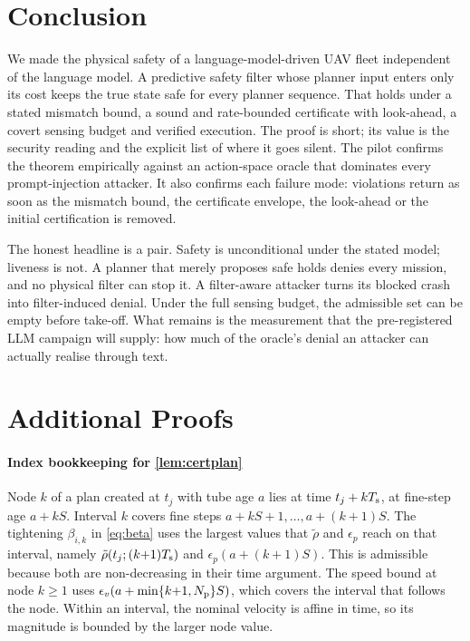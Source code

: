 \section{Conclusion}\label{sec:conclusion}
We made the physical safety of a language-model-driven UAV fleet
independent of the language model. A predictive safety filter whose planner
input enters only its cost keeps the true state safe for every planner
sequence. That holds under a stated mismatch bound, a sound and
rate-bounded certificate with look-ahead, a covert sensing budget and
verified execution. The proof is short; its value is the security reading
and the explicit list of where it goes silent. The pilot confirms the
theorem empirically against an action-space oracle that dominates every
prompt-injection attacker. It also confirms each failure mode: violations
return as soon as the mismatch bound, the certificate envelope, the
look-ahead or the initial certification is removed.

The honest headline is a pair. Safety is unconditional under the stated
model; liveness is not. A planner that merely proposes safe holds denies every
mission, and no physical filter can stop it. A filter-aware attacker turns its
blocked crash into filter-induced denial. Under the full sensing budget, the
admissible set can be empty before take-off. What remains is the measurement
that the pre-registered LLM campaign will supply: how much of the oracle's
denial an attacker can actually realise through text.




\appendices
\section{Additional Proofs}\label{app:proofs}

\paragraph{Index bookkeeping for \cref{lem:certplan}} Node $k$ of a plan
created at $t_j$ with tube age $a$ lies at time $t_j+kT_{\mathrm{s}}$, at fine-step age
$a+kS$. Interval $k$ covers fine steps $a+kS+1,\dots,a+(k{+}1)S$. The
tightening $\beta_{i,k}$ in \eqref{eq:beta} uses the largest values that
$\tilde\rho$ and $\epsilon_p$ reach on that interval, namely
$\tilde\rho(t_j;(k{+}1)T_{\mathrm{s}})$ and $\epsilon_p(a+(k{+}1)S)$. This is admissible
because both are non-decreasing in their time argument. The speed bound at
node $k\ge1$ uses $\epsilon_v(a+\min\{k{+}1,N_{\mathrm{p}}\}S)$, which covers the
interval that follows the node. Within an interval, the nominal velocity is
affine in time, so its magnitude is bounded by the larger node value.

